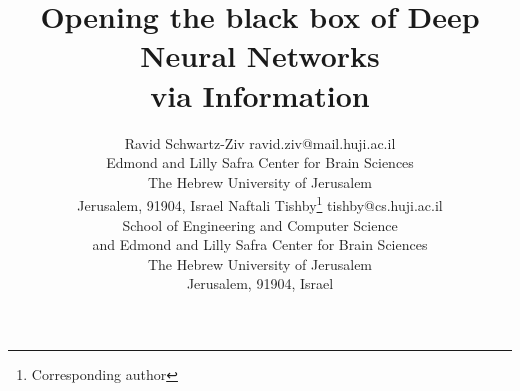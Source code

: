 \documentclass[11pt]{article}
\begin{document}
\title{Opening the black box of Deep Neural Networks\\ via Information}

\author{\name Ravid Schwartz-Ziv \email ravid.ziv@mail.huji.ac.il \\
       \addr Edmond and Lilly Safra Center for Brain Sciences\\
       The Hebrew University of Jerusalem\\
       Jerusalem,  91904, Israel
       \AND
       \name Naftali Tishby\footnote{Corresponding author} \email tishby@cs.huji.ac.il \\
       \addr School of Engineering and Computer Science\\ and 
       Edmond and Lilly Safra Center for Brain Sciences\\
       The Hebrew University of Jerusalem\\
       Jerusalem,  91904, Israel
       }


\maketitle
\end{document}
